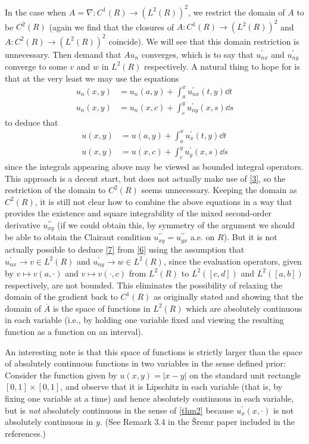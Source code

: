 \documentclass[11pt,leqno]{article}
\theoremstyle{plain}
\theoremstyle{definition}
\numberwithin{equation}{section}
\numberwithin{lem}{section}
\begin{document}
In the case when $A = \nabla\colon C^1(R)\to (L^2(R))^2$, we restrict the domain of $A$ to be $C^2(R)$ (again we find that the closures of $A\colon C^1(R)\to (L^2(R))^2$ and $A\colon C^2(R)\to (L^2(R))^2$ coincide). We will see that this domain restriction is unnecessary. Then demand that $Au_n$ converges, which is to say that $u^\prime_{nx}$ and $u^\prime_{ny}$ converge to some $v$ and $w$ in $L^2(R)$ respectively. A natural thing to hope for is that at the very least we may use the equations
\begin{align}\label{6}
    u_n(x,y) &= u_n(a,y) + \int_a^x u^\prime_{nx}(t,y)\dd t\\
    u_n(x,y) &= u_n(x,c) + \int_c^y u^\prime_{ny}(x,s)\dd s\nonumber
\end{align}
to deduce that 
\begin{align}\label{7}
    u(x,y) &= u(a,y) + \int_a^x u^\prime_{x}(t,y)\dd t\\
    u(x,y) &= u(x,c) + \int_c^y u^\prime_{y}(x,s)\dd s\nonumber
\end{align}
since the integrals appearing above may be viewed as bounded integral operators. This approach is a decent start, but does not actually make use of \eqref{3}, so the restriction of the domain to $C^2(R)$ seems unnecessary. Keeping the domain as $C^2(R)$, it is still not clear how to combine the above equations in a way that provides the existence and square integrability of the mixed second-order derivative $u^{\prime\prime}_{xy}$ (if we could obtain this, by symmetry of the argument we should be able to obtain the Clairaut condition $u^{\prime\prime}_{xy} = u^{\prime\prime}_{yx}$ a.e. on $R$). But it is not actually possible to deduce \eqref{7} from \eqref{6} using the assumption that $u^\prime_{nx}\to v\in L^2(R)$ and $u^\prime_{ny}\to w\in L^2(R)$, since the evaluation operators, given by $v\mapsto v(a,\cdot)$ and $v\mapsto v(\cdot,c)$ from $L^2(R)$ to $L^2([c,d])$ and $L^2([a,b])$ respectively, are not bounded. This eliminates the possibility of relaxing the domain of the gradient back to $C^1(R)$ as originally stated and showing that the domain of $\overline A$ is the space of functions in $L^2(R)$ which are absolutely continuous in each variable (i.e., by holding one variable fixed and viewing the resulting function as a function on an interval).

An interesting note is that this space of functions is strictly larger than the space of absolutely continuous functions in two variables in the sense defined prior: Consider the function given by $u(x,y) = |x-y|$ on the standard unit rectangle $[0,1]\times[0,1]$, and observe that it is Lipschitz in each variable (that is, by fixing one variable at a time) and hence absolutely continuous in each variable, but is \textit{not} absolutely continuous in the sense of \cref{thm2} because $u^\prime_x(x,\cdot)$ is not absolutely continuous in $y$. (See Remark 3.4 in the \v Sremr paper included in the references.)
\end{document}
